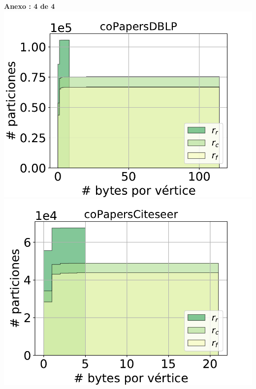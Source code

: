 \centering
\begin{minipage}{1\textwidth}
    \centering
    \textbf{Anexo \thechapter:  4 de 4}
    \includegraphics[width=.9\linewidth]{img/cdf/coPapersDBLP.pdf} \\
    \includegraphics[width=.9\linewidth]{img/cdf/coPapersCiteseer.pdf} \\
\end{minipage}
